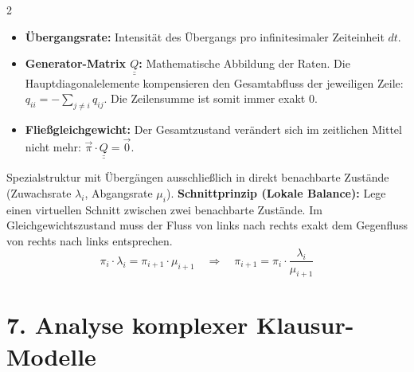\documentclass[a4paper, 9pt]{extarticle}
\begin{document}
\begin{multicols*}{2}
\begin{tcolorbox}[title={Theorie-Stichworte: Stetige Zeit}, colframe=markovviolet, colback=markovviolet!5, colbacktitle=markovviolet]
\begin{itemize}
    \item \textbf{Übergangsrate:} Intensität des Übergangs pro infinitesimaler Zeiteinheit $dt$.
    \item \textbf{Generator-Matrix $\underline{\underline{Q}}$:} Mathematische Abbildung der Raten. Die Hauptdiagonalelemente kompensieren den Gesamtabfluss der jeweiligen Zeile: $q_{ii} = -\sum_{j \neq i} q_{ij}$. Die Zeilensumme ist somit immer exakt 0.
    \item \textbf{Fließgleichgewicht:} Der Gesamtzustand verändert sich im zeitlichen Mittel nicht mehr: $\vec{\pi} \cdot \underline{\underline{Q}} = \vec{0}$.
\end{itemize}
\end{tcolorbox}

\begin{tcolorbox}[title={Geburts- und Todesprozesse (Schnittmethode)}, colframe=markovviolet, colback=markovviolet!5, colbacktitle=markovviolet]
Spezialstruktur mit Übergängen ausschließlich in direkt benachbarte Zustände (Zuwachsrate $\lambda_i$, Abgangsrate $\mu_i$).
\smallskip
\textbf{Schnittprinzip (Lokale Balance):} Lege einen virtuellen Schnitt zwischen zwei benachbarte Zustände. Im Gleichgewichtszustand muss der Fluss von links nach rechts exakt dem Gegenfluss von rechts nach links entsprechen.
$$\pi_i \cdot \lambda_i = \pi_{i+1} \cdot \mu_{i+1} \quad \Rightarrow \quad \pi_{i+1} = \pi_i \cdot \frac{\lambda_i}{\mu_{i+1}}$$
\end{tcolorbox}

\section*{7. Analyse komplexer Klausur-Modelle}


\end{multicols*}
\end{document}
